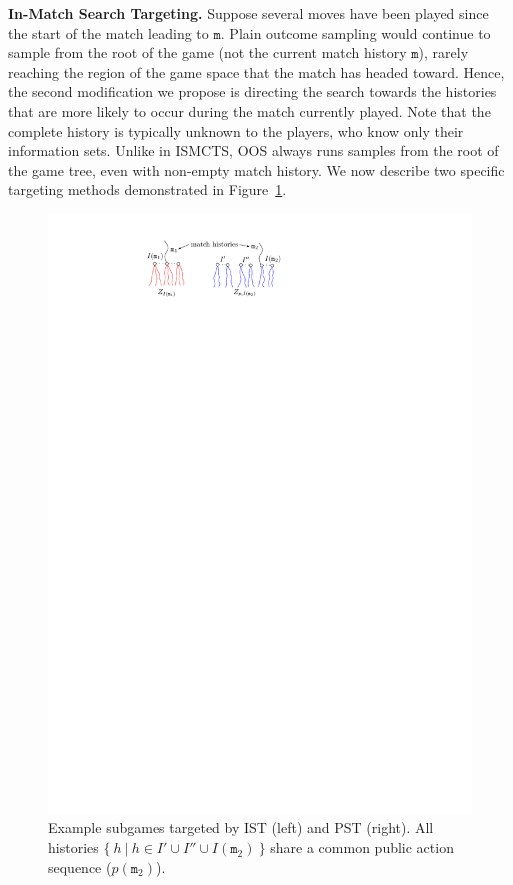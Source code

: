 \documentclass{aamas2015}
\newcommand{\ttm}{\mathtt{m}}
\begin{document}
{\bf In-Match Search Targeting.}
Suppose several moves have been played since the start of the match leading to $\ttm$. 
Plain outcome sampling would continue to sample from the root of the game (not the current match history $\ttm$), rarely reaching the region of the game space that the match has headed toward. 
Hence, the second modification we propose is directing the search towards the histories that are more likely to occur during the match currently played.
Note that the complete history is typically unknown to the players, who know only their information sets.
Unlike in ISMCTS, OOS always runs samples from the root of the game tree, even with non-empty match history.
We now describe two specific targeting methods demonstrated in Figure~\ref{fig:targeting}.

\begin{figure}[t]
\begin{center}
\includegraphics[scale=1]{fig/targeting}
\end{center}
\vskip-5mm
\caption{Example subgames targeted by IST (left) and PST (right). All histories $\{~h~|~h \in I' \cup I'' \cup I(\ttm_2)~\}$ 
share a common public action sequence ($p(\ttm_2)$). \label{fig:targeting}}
\end{figure}
\end{document}
